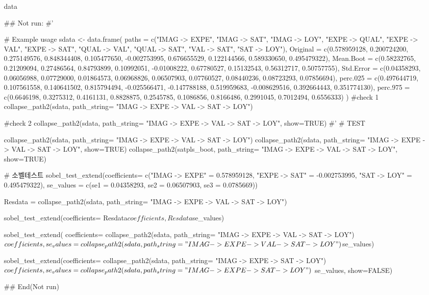 \documentclass[a4paper]{book}
\begin{document}
%
\begin{Value}
data
\end{Value}
%
\begin{Examples}
\begin{ExampleCode}

\#\# Not run: 
#'

# Example usage
sdata <- data.frame(
  paths = c("IMAG -> EXPE", "IMAG -> SAT", "IMAG -> LOY",
   "EXPE -> QUAL", "EXPE -> VAL", "EXPE -> SAT",
            "QUAL -> VAL", "QUAL -> SAT",
            "VAL -> SAT", "SAT -> LOY"),
  Original = c(0.578959128, 0.200724200, 0.275149576,
   0.848344408, 0.105477650, -0.002753995,
               0.676655529, 0.122144566, 0.589330650, 0.495479322),
  Mean.Boot = c(0.58232765, 0.21209094, 0.27486564,
  0.84793899, 0.10992051, -0.01008222,
                0.67780527, 0.15132543, 0.56312717, 0.50757755),
  Std.Error = c(0.04358293, 0.06056988, 0.07729000,
  0.01864573, 0.06968826, 0.06507903,
                0.07760527, 0.08440236, 0.08723293, 0.07856694),
  perc.025 = c(0.497644719, 0.107561558, 0.140641502,
   0.815794494, -0.025566471, -0.147788188,
               0.519959683, -0.008629516, 0.392664443, 0.351774130),
  perc.975 = c(0.6646198, 0.3275312, 0.4161131,
   0.8828875, 0.2545785, 0.1086856,
               0.8166486, 0.2991045, 0.7012494, 0.6556333)
)
#check 1
collapse_path2(sdata, path_string= "IMAG -> EXPE -> VAL -> SAT -> LOY")

#check 2
collapse_path2(sdata, path_string= "IMAG -> EXPE -> VAL -> SAT -> LOY", show=TRUE)
#'
# TEST

collapse_path2(sdata, path_string= "IMAG -> EXPE -> VAL -> SAT -> LOY")
collapse_path2(sdata, path_string= "IMAG -> EXPE -> VAL -> SAT -> LOY", show=TRUE)
collapse_path2(satpls_boot, path_string= "IMAG -> EXPE -> VAL -> SAT -> LOY", show=TRUE)

# 소벨테스트
sobel_test_extend(coefficients= c("IMAG -> EXPE" = 0.578959128,
                                  "EXPE -> SAT" = -0.002753995,
                                  "SAT -> LOY" = 0.495479322),
                  se_values = c(se1 = 0.04358293,
                                se2 = 0.06507903,
                                se3 = 0.0785669))


Resdata  =   collapse_path2(sdata, path_string= "IMAG -> EXPE -> VAL -> SAT -> LOY")

sobel_test_extend(coefficients= Resdata$coefficients, Resdata$se_values)


sobel_test_extend(
  coefficients= collapse_path2(sdata,
              path_string= "IMAG -> EXPE -> VAL -> SAT -> LOY")$coefficients,
  se_values =  collapse_path2(sdata,
        path_string= "IMAG -> EXPE -> VAL -> SAT -> LOY")$se_values)


sobel_test_extend(coefficients= collapse_path2(sdata,
         path_string=  "IMAG -> EXPE -> SAT -> LOY")$coefficients,
         se_values =  collapse_path2(sdata, path_string= "IMAG -> EXPE -> SAT -> LOY")$
                    se_values, show=FALSE)


## End(Not run)


\end{ExampleCode}
\end{Examples}
\end{document}
